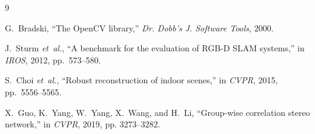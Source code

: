 \documentclass[review]{elsarticle}
\begin{document}

\begin{thebibliography}{9}

G.~Bradski, ``The OpenCV library,'' \emph{Dr. Dobb's J. Software Tools}, 2000.

J.~Sturm \emph{et~al.}, ``A benchmark for the evaluation of RGB-D SLAM systems,'' in \emph{IROS}, 2012, pp.~573--580.

S.~Choi \emph{et~al.}, ``Robust reconstruction of indoor scenes,'' in \emph{CVPR}, 2015, pp.~5556--5565.


X.~Guo, K.~Yang, W.~Yang, X.~Wang, and H.~Li, ``Group-wise correlation stereo network,'' in \emph{CVPR}, 2019, pp. 3273--3282.

\end{thebibliography}
\end{document}
